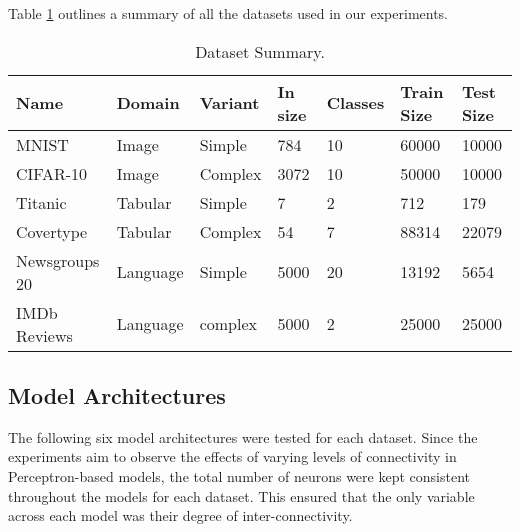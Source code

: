 Table \ref{tab:dataSummary} outlines a summary of all the datasets used in our experiments.


\begin{table}[h!]
  \centering
    \caption{Dataset Summary.}
   \begin{tabular}{|l|l|l|l|l|l|l|}
    \hline
    \textbf{Name} & \textbf{Domain} & \textbf{Variant} & \textbf{In size} & \textbf{Classes} & \textbf{Train Size} & \textbf{Test Size} \\
    \hline
    MNIST & Image & Simple & 784 & 10 & 60000 & 10000 \\
    CIFAR-10 & Image & Complex & 3072 & 10 & 50000 & 10000 \\
    Titanic & Tabular & Simple & 7 & 2 & 712 & 179 \\
    Covertype & Tabular & Complex & 54 & 7 & 88314 & 22079 \\
    Newsgroups 20 & Language & Simple & 5000 & 20 & 13192 & 5654 \\
    IMDb Reviews & Language & complex & 5000 & 2 & 25000 & 25000 \\
    \hline
  \end{tabular}

  \label{tab:dataSummary}
\end{table}


\subsection{Model Architectures}
The following six model architectures were tested for each dataset. Since the experiments aim to observe the effects of varying levels of connectivity in Perceptron-based models, the total number of neurons were kept consistent throughout the models for each dataset. This ensured that the only variable across each model was their degree of inter-connectivity.


